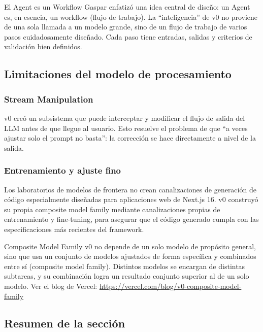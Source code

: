 \documentclass[a4paper]{article}
\begin{document}
\begin{importantbox}{El Agent es un Workflow}
Gaspar enfatizó una idea central de diseño: un Agent es, en esencia, un workflow (flujo de trabajo). La ``inteligencia'' de v0 no proviene de una sola llamada a un modelo grande, sino de un flujo de trabajo de varios pasos cuidadosamente diseñado. Cada paso tiene entradas, salidas y criterios de validación bien definidos.
\end{importantbox}

\subsection{Limitaciones del modelo de procesamiento}

\subsubsection{Stream Manipulation}

v0 creó un subsistema que puede interceptar y modificar el flujo de salida del LLM antes de que llegue al usuario. Esto resuelve el problema de que ``a veces ajustar solo el prompt no basta'': la corrección se hace directamente a nivel de la salida.

\subsubsection{Entrenamiento y ajuste fino}

Los laboratorios de modelos de frontera no crean canalizaciones de generación de código especialmente diseñadas para aplicaciones web de Next.js 16. v0 construyó su propia composite model family mediante canalizaciones propias de entrenamiento y fine-tuning, para asegurar que el código generado cumpla con las especificaciones más recientes del framework.

\begin{knowledgebox}{Composite Model Family}
v0 no depende de un solo modelo de propósito general, sino que usa un conjunto de modelos ajustados de forma específica y combinados entre sí (composite model family). Distintos modelos se encargan de distintas subtareas, y su combinación logra un resultado conjunto superior al de un solo modelo. Ver el blog de Vercel: \url{https://vercel.com/blog/v0-composite-model-family}
\end{knowledgebox}

\subsection{Resumen de la sección}
\end{document}
